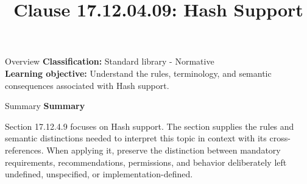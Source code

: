 \documentclass[10pt,letterpaper]{article}
\title{Clause 17.12.04.09: Hash Support}
\author{}
\date{}
\begin{document}
\maketitle
\begin{CornellOverviewBox}{Overview}
\textbf{Classification:} Standard library - Normative\\[2pt]
\textbf{Learning objective:} Understand the rules, terminology, and semantic consequences associated with Hash support.
\end{CornellOverviewBox}\begin{CornellSummaryBox}{Summary}
{\sffamily\bfseries\color{Accent} Summary}\par\vspace{3pt}Section 17.12.4.9 focuses on Hash support. The section supplies the rules and semantic distinctions needed to interpret this topic in context with its cross-references. When applying it, preserve the distinction between mandatory requirements, recommendations, permissions, and behavior deliberately left undefined, unspecified, or implementation-defined.
\end{CornellSummaryBox}
\end{document}
